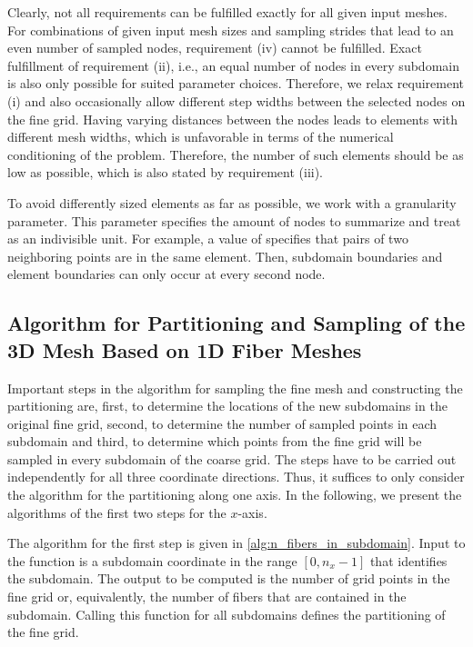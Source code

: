 Clearly, not all requirements can be fulfilled exactly for all given input meshes. For combinations of given input mesh sizes and sampling strides that lead to an even number of sampled nodes, requirement (iv) cannot be fulfilled. 
Exact fulfillment of requirement (ii), i.e., an equal number of nodes in every subdomain is also only possible for suited parameter choices. Therefore, we relax requirement (i) and also occasionally allow different step widths between the selected nodes on the fine grid. Having varying distances between the nodes leads to elements with different mesh widths, which is unfavorable in terms of the numerical conditioning of the problem. Therefore, the number of such elements should be as low as possible, which is also stated by requirement (iii).

To avoid differently sized elements as far as possible, we work with a granularity parameter. This parameter specifies the amount of nodes to summarize and treat as an indivisible unit. For example, a value of  specifies that pairs of two neighboring points are in the same element. Then, subdomain boundaries and element boundaries can only occur at every second node.

\subsection{Algorithm for Partitioning and Sampling of the 3D Mesh Based on 1D Fiber Meshes}\label{sec:partitioning_alg1}

Important steps in the algorithm for sampling the fine mesh and constructing the partitioning are, first, to determine the locations of the new subdomains in the original fine grid, second, to determine the number of sampled points in each subdomain and third, to determine which points from the fine grid will be sampled in every subdomain of the coarse grid. The steps have to be carried out independently for all three coordinate directions. Thus, it suffices to only consider the algorithm for the partitioning along one axis.
In the following, we present the algorithms of the first two steps for the $x$-axis. 

The algorithm for the first step is given in \cref{alg:n_fibers_in_subdomain}. Input to the function  is a subdomain coordinate in the range $[0,n_x-1]$ that identifies the subdomain. The output to be computed is the number of grid points in the fine grid or, equivalently, the number of fibers that are contained in the subdomain. Calling this function for all subdomains defines the partitioning of the fine grid.

